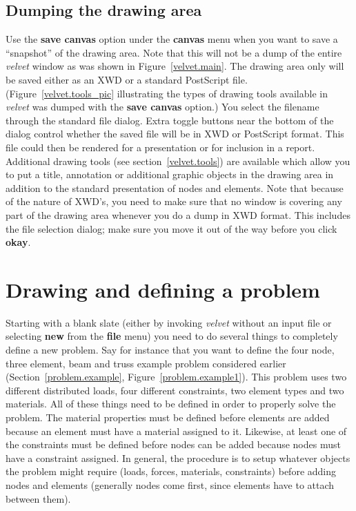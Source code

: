 \subsection{Dumping the drawing area}
Use the {\bf save canvas} option under the {\bf canvas} menu when you 
want to save a ``snapshot'' of the drawing area.  Note that this will 
not be a dump of the entire {\em velvet} window as was shown in 
Figure~\ref{velvet.main}. The drawing area only will be saved 
either as an XWD or a standard PostScript file.  
(Figure~\ref{velvet.tools_pic} illustrating the types of drawing tools 
available in {\em velvet} was dumped with the {\bf save canvas} option.) 
You select the filename through the standard file dialog.  Extra toggle 
buttons near the bottom of the dialog control whether
the saved file will be in XWD or PostScript format.  This file could then 
be rendered for a presentation or for inclusion in a report.  Additional 
drawing tools (see section~\ref{velvet.tools}) are available which
allow you to put a title, annotation or additional graphic objects in
the drawing area in addition to the standard presentation of nodes and 
elements. Note that because of the nature of XWD's, you need to make sure that
no window is covering any part of the drawing area whenever you do a dump in
XWD format.  This includes the file selection dialog; make sure you move it 
out of the way before you click {\bf okay}.

\section{Drawing and defining a problem}
\label{velvet.drawing_defining}
Starting with a blank slate (either by invoking {\em velvet} without an input 
file or selecting {\bf new} from the {\bf file} menu) you need to do several 
things to completely define a new problem.  Say for instance that you
want to define the four node, three element, beam and truss example problem 
considered earlier (Section~\ref{problem.example}, 
Figure~\ref{problem.example1}).  This problem uses two different distributed 
loads, 
four different constraints, two element types and two materials.  All of 
these things need to be defined in order to properly solve the problem.  
The material properties must be defined before elements are added because an 
element must have a material assigned to it.  Likewise, at least one of the 
constraints must be defined before nodes can be added because nodes must 
have a constraint assigned.  In general, the procedure is to setup whatever 
objects the problem might require (loads, forces, materials, constraints) 
before adding nodes and elements (generally nodes come first, since elements 
have to attach between them).  	


